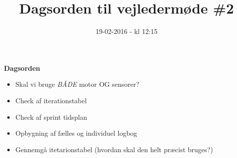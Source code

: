 \documentclass{article}
\title{Dagsorden til vejledermøde \#2}
\date{19-02-2016 - kl 12:15}
\begin{document}
	\maketitle
	\textbf{Dagsorden}
	
	\begin{itemize}
		\item Skal vi bruge \textit{BÅDE} motor OG sensorer?
		\item Check af iterationstabel
		\item Check af sprint tidsplan
		\item Opbygning af fælles og individuel logbog
		\item Gennemgå itetarionstabel (hvordan skal den helt præcist bruges?)
	\end{itemize}
\end{document}
